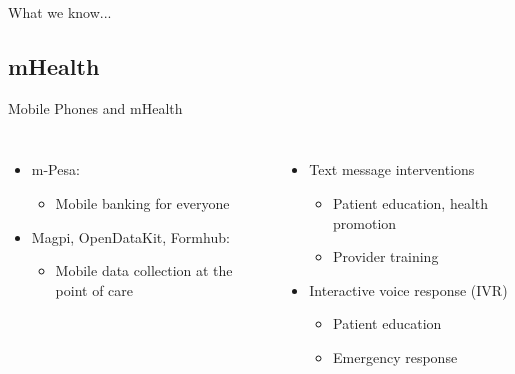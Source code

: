 \documentclass[xcolor=x11names,compress]{beamer}
\renewcommand{\(}{\begin{columns}}
\renewcommand{\)}{\end{columns}}
\newcommand{\<}[1]{\begin{column}{#1}}
\renewcommand{\>}{\end{column}}
\begin{document}
\begin{frame}{What we know...}



\end{frame}

\subsection{mHealth}
\begin{frame}[t]{Mobile Phones and mHealth}
\begin{columns}[T]
\column{2in}
\begin{itemize}
	\item<1->{m-Pesa:}
		\begin{itemize}
		\item<1->{Mobile banking for everyone}
		\end{itemize}
	\item<2->{Magpi, OpenDataKit, Formhub:}
		\begin{itemize}
		\item<2->{Mobile data collection at the point of care}
		\end{itemize}
\end{itemize}
\column{2in}
\begin{itemize}
	\item<3->{Text message interventions}
		\begin{itemize}
		\item<3->{Patient education, health promotion}
		\item<3->{Provider training}
		\end{itemize}
	\item<4->{Interactive voice response (IVR)}
		\begin{itemize}
		\item<4->{Patient education}
		\item<4->{Emergency response}
		\end{itemize}
\end{itemize}
\end{columns}
\end{frame}
\end{document}
